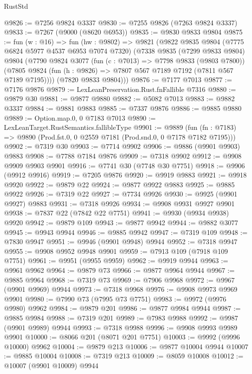 \begin{lexlean}{RustStd}
\begin{coremodule}
@9826 := @7256 @9824 @3337
@9830 := @7255 @9826 (@7263 @9824 @3337)
@9833 := @7267 (@9000 (@8620 @6953))
@9835 := @9830 @9833 @9804
@9875 := fun (w : @16) =>
  fun (hw : @9802) =>
  @9821
    (@9822
      @9835
      @9804
      (@7775 @6824 @5977 @4537 @6953 @7074 @7320)
      (@7338
        @9835
        (@7299 @9833 @9804)
        @9804
        (@7790
          @9824
          @3077
          (fun (c : @7013) => @7798 @9833 (@9803 @7800))
          (@7805 @9824 (fun (h : @9826) => @7807 @567 @7189 @7192 (@7811 @567 @7189 @7195))))
        (@7820 @9833 @9804)))
@9876 := @7177 @7013
@9877 := @7176 @9876
@9879 := LexLeanPreservation.Rust.fnFallible @7316
@9880 := @9879 @30
@9881 := @9877 @9880
@9882 := @5082 @7013
@9883 := @9882 @3337
@9884 := @9881 @9883
@9885 := @7337 @9876
@9886 := @9885 @9880
@9889 := Option.map.{0, 0} @7183 @7013
@9890 := LexLeanTarget.RustSemantics.fallibleType
@9901 := @9889
    (fun (fn : @7183) => @9890 (Prod.fst.{0, 0} @2559 @7181 (Prod.snd.{0, 0} @7178 @7182 @7195)))
@9902 := @7319 @30
@9903 := @7714 @9902
@9906 := @9886 (@9901 @9903) @9883
@9908 := @7788 @7184 @9876
@9909 := @7318 @9902
@9912 := @9908 @9909 @9903 @9901
@9916 := @7741 @30 (@7748 @30 @7751)
@9918 := @9906 (@9912 @9916)
@9919 := @7205 @9876
@9920 := @9919 @9883
@9921 := @9918 @9920
@9922 := @9879 @22
@9924 := @9877 @9922 @9883
@9925 := @9885 @9922
@9926 := @7319 @22
@9927 := @7734 @9926
@9930 := @9925 (@9901 @9927) @9883
@9931 := @7318 @9926
@9934 := @9908 @9931 @9927 @9901
@9938 := @7837 @22 (@7842 @22 @7751)
@9941 := @9930 (@9934 @9938) @9920
@9942 := @9879 @109
@9943 := @9877 @9942
@9944 := @9882 @3077
@9945 := @9943 @9944
@9946 := @9885 @9942
@9947 := @7319 @109
@9948 := @7830 @9947
@9951 := @9946 (@9901 @9948) @9944
@9952 := @7318 @9947
@9955 := @9908 @9952 @9948 @9901
@9959 := @7913 @109 (@7918 @109 @7751)
@9961 := @9951 (@9955 @9959)
@9962 := @9919 @9944
@9963 := @9961 @9962
@9964 := @9879 @73
@9966 := @9877 @9964 @9944
@9967 := @9885 @9964
@9968 := @7319 @73
@9969 := @7906 @9968
@9972 := @9967 (@9901 @9969) @9944
@9973 := @7318 @9968
@9976 := @9908 @9973 @9969 @9901
@9980 := @7990 @73 (@7995 @73 @7751)
@9983 := @9972 (@9976 @9980) @9962
@9984 := @9879 @201
@9986 := @9877 @9984 @9944
@9987 := @9885 @9984
@9988 := @7319 @201
@9989 := @7983 @9988
@9992 := @9987 (@9901 @9989) @9944
@9993 := @7318 @9988
@9996 := @9908 @9993 @9989 @9901
@10000 := @8066 @201 (@8071 @201 @7751)
@10003 := @9992 (@9996 @10000) @9962
@10004 := @9879 @213
@10006 := @9877 @10004 @9944
@10007 := @9885 @10004
@10008 := @7319 @213
@10009 := @8059 @10008
@10012 := @10007 (@9901 @10009) @9944

\end{coremodule}
\end{lexlean}
